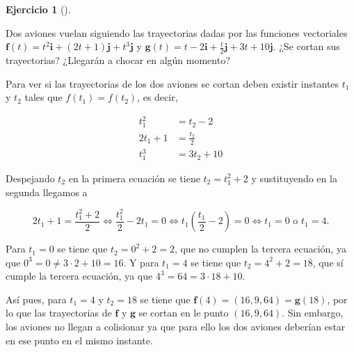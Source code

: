 \documentclass[
  a4paper,
]{scrreport}
\theoremstyle{definition}
\newtheorem{exercise}{Ejercicio}[chapter]
\theoremstyle{remark}
\begin{document}
\begin{exercise}[]\protect\hypertarget{exr-intersección-trayectorias}{}\label{exr-intersección-trayectorias}

Dos aviones vuelan siguiendo las trayectorias dadas por las funciones
vectoriales
\(\mathbf{f}(t)=t^2\mathbf{i}+(2t+1)\mathbf{j}+t^3\mathbf{j}\) y
\(\mathbf{g}(t)=t-2\mathbf{i}+\frac{t}{2}\mathbf{j}+3t+10\mathbf{j}\).
¿Se cortan sus trayectorias? ¿Llegarán a chocar en algún momento?

\end{exercise}

\begin{tcolorbox}[enhanced jigsaw, rightrule=.15mm, opacityback=0, bottomtitle=1mm, titlerule=0mm, toprule=.15mm, breakable, colframe=quarto-callout-tip-color-frame, left=2mm, opacitybacktitle=0.6, title=\textcolor{quarto-callout-tip-color}{\faLightbulb}\hspace{0.5em}{Solución}, toptitle=1mm, colback=white, colbacktitle=quarto-callout-tip-color!10!white, arc=.35mm, bottomrule=.15mm, coltitle=black, leftrule=.75mm]

Para ver si las trayectorias de los dos aviones se cortan deben existir
instantes \(t_1\) y \(t_2\) tales que \(f(t_1)=f(t_2)\), es decir,

\begin{align*}
t_1^2 &= t_2-2\\
2t_1+1 &= \frac{t_2}{2}\\
t_1^3 &= 3t_2+10
\end{align*}

Despejando \(t_2\) en la primera ecuación se tiene \(t_2 = t_1^2+2\) y
sustituyendo en la segunda llegamos a

\[
2t_1 + 1 = \frac{t_1^2+2}{2} \Leftrightarrow \frac{t_1^2}{2}-2t_1 = 0 \Leftrightarrow t_1\left(\frac{t_1}{2}-2\right)=0 \Leftrightarrow t_1 = 0 \mbox{ o } t_1 = 4.
\]

Para \(t_1=0\) se tiene que \(t_2 = 0^2+2 = 2\), que no cumplen la
tercera ecuación, ya que \(0^3=0\neq 3\cdot 2 +10 =16\). Y para
\(t_1=4\) se tiene que \(t_2=4^2+2=18\), que sí cumple la tercera
ecuación, ya que \(4^3 = 64 = 3\cdot 18 + 10\).

Así pues, para \(t_1=4\) y \(t_2=18\) se tiene que
\(\mathbf{f}(4) = (16, 9, 64) = \mathbf{g}(18)\), por lo que las
trayectorias de \(\mathbf{f}\) y \(\mathbf{g}\) se cortan en le punto
\((16, 9, 64)\). Sin embargo, los aviones no llegan a colisionar ya que
para ello los dos aviones deberían estar en ese punto en el mismo
instante.

\end{tcolorbox}
\end{document}
